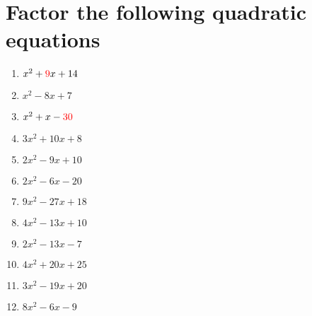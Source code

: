 \documentclass[12pt]{article}
\begin{document}
\section*{Factor the following quadratic equations}
\begin{minipage}[t]{0.45\textwidth}
    \begin{enumerate}[label=\#\arabic*]
        \setcounter{enumi}{0} %
        \item  $x^2+{\color{red} 9}x+14$
        \vspace{1em}
        \item  $x^2-8x+7$
        \vspace{1em}
        \item  $x^2+x-{\color{red} 30}$
        \vspace{1em}
        \item  $3x^2+10x+8$
        \vspace{1em}
        \item  $2x^2-9x+10$
        \vspace{1em}
        \item  $2x^2-6x-20$
        \end{enumerate}
\end{minipage}%
\hspace{1cm}
\begin{minipage}[t]{0.45\textwidth}
    \begin{enumerate}[label=\#\arabic*]
        \setcounter{enumi}{6} %
        \item  $9x^2-27x+18$
        \vspace{1em}
        \item  $4x^2-13x+10$
        \vspace{1em}
        \item  $2x^2-13x-7$
        \vspace{1em}
        \item  $4x^2+20x+25$
        \vspace{1em}
        \item  $3x^2-19x+20$
        \vspace{1em}
        \item  $8x^2-6x-9$

    \end{enumerate}
\end{minipage}
\end{document}

